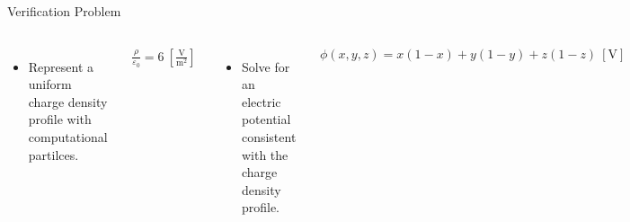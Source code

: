 \documentclass[aspectratio=169, 16pt]{beamer}
\newcommand{\unit}[1]{
    \: \left[ \text{#1} \right]
}
\newcommand{\fracunit}[2]{
    \: \left[
    \frac{\text{#1}}{\text{#2}}
    \right]
}
\begin{document}
\begin{frame}{Verification Problem}
  \vspace{1cm}
  \begin{columns}
    \begin{itemize}
      \item Represent a uniform charge density profile with computational partilces.
    \end{itemize}
    \begin{align*}
      \frac{\rho}{\varepsilon_0} = 6
      \fracunit{V}{m$^2$}
    \end{align*}
    \begin{itemize}
      \item Solve for an electric potential consistent with the charge density profile.
    \end{itemize}
    \begin{align*}
      \phi(x, y, z) 
      =x  (1 - x) + y (1 - y) + z  (1 - z) 
      \unit{V}
    \end{align*}
    \begin{figure}[H]
      \centering
      \includegraphics[width=0.8\textwidth]{figs/density_verification.png}
    \end{figure}
  \end{columns}
\end{frame}
\end{document}
